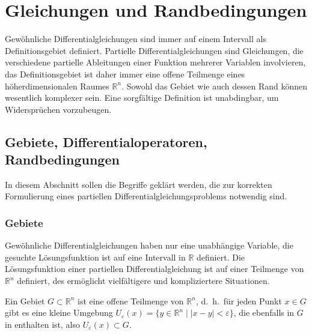 %
%
%
\section{Gleichungen und Randbedingungen
\label{buch:pde:section:gleichungen-und-randbedingungen}}
Gewöhnliche Differentialgleichungen sind immer auf einem
Intervall als Definitionsgebiet definiert.
Partielle Differentialgleichungen sind Gleichungen, die verschiedene
partielle Ableitungen einer Funktion mehrerer Variablen involvieren,
das Definitionsgebiet ist daher immer eine offene Teilmenge 
eines höherdimensionalen Raumes $\mathbb{R}^n$.
Sowohl das Gebiet wie auch dessen Rand können wesentlich komplexer sein.
Eine sorgfältige Definition ist unabdingbar, um Widersprüchen vorzubeugen.

%
%
\subsection{Gebiete, Differentialoperatoren, Randbedingungen}
In diesem Abschnitt sollen die Begriffe geklärt werden, die zur
korrekten Formulierung eines partiellen Differentialgleichungsproblems
notwendig sind.

%
%
\subsubsection{Gebiete}
Gewöhnliche Differentialgleichungen haben nur eine unabhängige
Variable, die gesuchte Lösungsfunktion ist auf eine 
Intervall in $\mathbb{R}$ definiert.
Die Lösungsfunktion einer partiellen Differentialgleichung
ist auf einer Teilmenge von $\mathbb{R}^n$ definiert, des 
ermöglicht vielfältigere und kompliziertere Situationen.

\begin{definition}
\label{buch:pde:definition:gebiet}
Ein Gebiet $G\subset\mathbb{R}^n$ ist eine offene Teilmenge
von $\mathbb{R}^n$, d.~h.~für jeden Punkt $x\in G$ gibt es
eine kleine Umgebung
\(
U_{\varepsilon}(x)
=
\{y\in\mathbb{R}^n\mid |x-y|<\varepsilon\}
\), die ebenfalls in $G$ in enthalten ist,
also $U_{\varepsilon}(x)\subset G$.
%
\end{definition}

%
%
